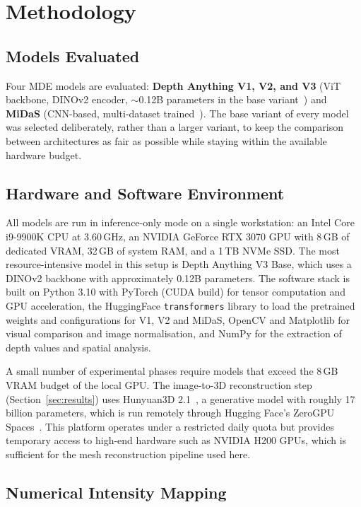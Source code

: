 \documentclass[10pt,twocolumn]{article}
\begin{document}
\section{Methodology}
\label{sec:method}

\subsection{Models Evaluated}

Four MDE models are evaluated: \textbf{Depth Anything V1, V2, and V3} (ViT backbone,
DINOv2 encoder, $\sim$0.12B parameters in the base variant~\cite{depthanythingv3}) and
\textbf{MiDaS} (CNN-based, multi-dataset trained~\cite{ranftl2020}). The base variant of
every model was selected deliberately, rather than a larger variant, to keep the
comparison between architectures as fair as possible while staying within the available
hardware budget.

\subsection{Hardware and Software Environment}

All models are run in inference-only mode on a single workstation: an Intel Core
i9-9900K CPU at 3.60\,GHz, an NVIDIA GeForce RTX 3070 GPU with 8\,GB of dedicated
VRAM, 32\,GB of system RAM, and a 1\,TB NVMe SSD. The most resource-intensive model
in this setup is Depth Anything V3 Base, which uses a DINOv2 backbone with
approximately 0.12B parameters. The software stack is built on Python 3.10 with
PyTorch (CUDA build) for tensor computation and GPU acceleration, the HuggingFace
\texttt{transformers} library to load the pretrained weights and configurations for V1,
V2 and MiDaS, OpenCV and Matplotlib for visual comparison and image normalisation, and
NumPy for the extraction of depth values and spatial analysis.

A small number of experimental phases require models that exceed the 8\,GB VRAM
budget of the local GPU. The image-to-3D reconstruction step (Section~\ref{sec:results})
uses Hunyuan3D 2.1~\cite{hunyuan3d}, a generative model with roughly 17 billion
parameters, which is run remotely through Hugging Face's ZeroGPU Spaces~\cite{zerogpu}.
This platform operates under a restricted daily quota but provides temporary access to
high-end hardware such as NVIDIA H200 GPUs, which is sufficient for the mesh
reconstruction pipeline used here.

\subsection{Numerical Intensity Mapping}
\end{document}
